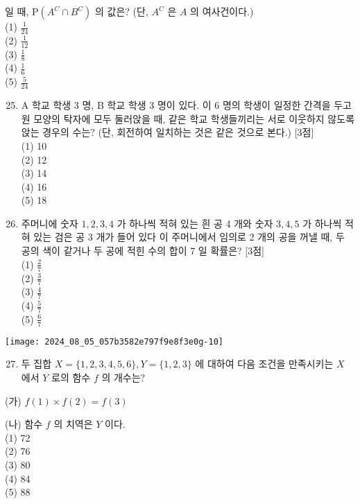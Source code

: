 \documentclass[10pt]{article}
\begin{document}
일 때, \(\mathrm{P}\left(A^{C} \cap B^{C}\right)\) 의 값은? (단, \(A^{C}\) 은 \(A\) 의 여사건이다.)\\
(1) \(\frac{1}{24}\)\\
(2) \(\frac{1}{12}\)\\
(3) \(\frac{1}{8}\)\\
(4) \(\frac{1}{6}\)\\
(5) \(\frac{5}{24}\)

\begin{enumerate}
  \setcounter{enumi}{24}
  \item A 학교 학생 3 명, B 학교 학생 3 명이 있다. 이 6 명의 학생이 일정한 간격을 두고 원 모양의 탁자에 모두 둘러앉을 때, 같은 학교 학생들끼리는 서로 이웃하지 않도록 앉는 경우의 수는? (단, 회전하여 일치하는 것은 같은 것으로 본다.) [3점]\\
(1) 10\\
(2) 12\\
(3) 14\\
(4) 16\\
(5) 18

  \item 주머니에 숫자 \(1,2,3,4\) 가 하나씩 적혀 있는 흰 공 4 개와 숫자 \(3,4,5\) 가 하나씩 적혀 있는 검은 공 3 개가 들어 있다 이 주머니에서 임의로 2 개의 공을 꺼낼 때, 두 공의 색이 같거나 두 공에 적힌 수의 합이 7 일 확률은? [3점]\\
(1) \(\frac{2}{7}\)\\
(2) \(\frac{3}{7}\)\\
(3) \(\frac{4}{7}\)\\
(4) \(\frac{5}{7}\)\\
(5) \(\frac{6}{7}\)

\end{enumerate}

\begin{center}
\texttt{[image: 2024\_08\_05\_057b3582e797f9e8f3e0g-10]}
\end{center}

\begin{enumerate}
  \setcounter{enumi}{26}
  \item 두 집합 \(X=\{1,2,3,4,5,6\}, Y=\{1,2,3\}\) 에 대하여 다음 조건을 만족시키는 \(X\) 에서 \(Y\) 로의 함수 \(f\) 의 개수는?
\end{enumerate}

(가) \(f(1) \times f(2)=f(3)\)

(나) 함수 \(f\) 의 치역은 \(Y\) 이다.\\
(1) 72\\
(2) 76\\
(3) 80\\
(4) 84\\
(5) 88
\end{document}
